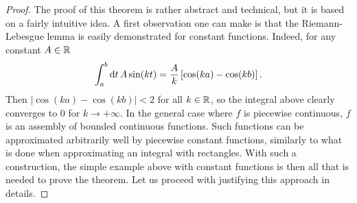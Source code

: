 \begin{proof}
	The proof of this theorem is rather abstract and technical, but it is based on a fairly
	intuitive idea. A first observation one can make is that the Riemann-Lebesgue lemma is
	easily demonstrated for constant functions. Indeed, for any constant $A\in\mathbb{R}$
	\begin{equation}
		\int_a^b\mathrm{d} t\,A\sin(kt)=\frac{A}{k}\,[\cos(ka)-\cos(kb)]\,.
		\label{eq:rl-const}
	\end{equation}
	Then $|\cos(ka)-\cos(kb)|<2$ for all $k\in\mathbb{R}$, so the integral above clearly converges
	to $0$ for $k\to+\infty$. In the general case where $f$ is piecewise continuous, $f$ is
	an assembly of bounded continuous functions. Such functions can be approximated
	arbitrarily well by piecewise constant functions, similarly to what is done when
	approximating an integral with rectangles. With such a construction, the simple example
	above with constant functions is then all that is needed to prove the theorem. Let us
	proceed with justifying this approach in details.


\end{proof}
